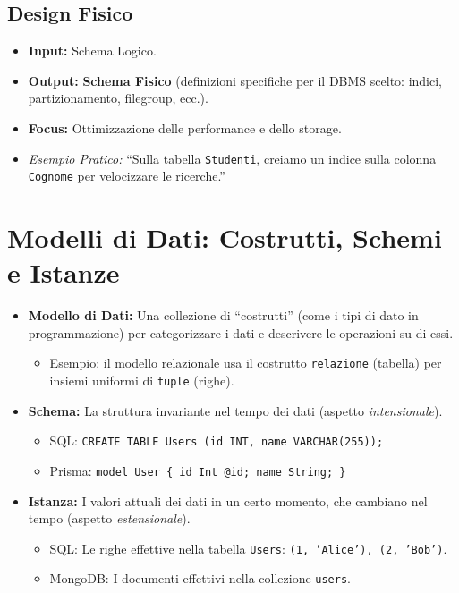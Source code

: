 \subsection{Design Fisico}
\begin{itemize}
	\item \textbf{Input:} Schema Logico.
	\item \textbf{Output:} \textbf{Schema Fisico} (definizioni specifiche per il DBMS scelto: indici, partizionamento, filegroup, ecc.).
	\item \textbf{Focus:} Ottimizzazione delle performance e dello storage.
	\item \textit{Esempio Pratico:} ``Sulla tabella \texttt{Studenti}, creiamo un indice sulla colonna \texttt{Cognome} per velocizzare le ricerche.''
\end{itemize}

\section{Modelli di Dati: Costrutti, Schemi e Istanze}
\begin{itemize}
	\item \textbf{Modello di Dati:} Una collezione di ``costrutti'' (come i tipi di dato in programmazione) per categorizzare i dati e descrivere le operazioni su di essi.
	\begin{itemize}
		\item Esempio: il modello relazionale usa il costrutto \texttt{relazione} (tabella) per insiemi uniformi di \texttt{tuple} (righe).
	\end{itemize}
	\item \textbf{Schema:} La struttura invariante nel tempo dei dati (aspetto \textit{intensionale}).
	\begin{itemize}
		\item SQL: \texttt{CREATE TABLE Users (id INT, name VARCHAR(255));}
		\item Prisma: \texttt{model User \{ id Int @id; name String; \}}
	\end{itemize}
	\item \textbf{Istanza:} I valori attuali dei dati in un certo momento, che cambiano nel tempo (aspetto \textit{estensionale}).
	\begin{itemize}
		\item SQL: Le righe effettive nella tabella \texttt{Users}: \texttt{(1, 'Alice'), (2, 'Bob')}.
		\item MongoDB: I documenti effettivi nella collezione \texttt{users}.
	\end{itemize}
\end{itemize}

